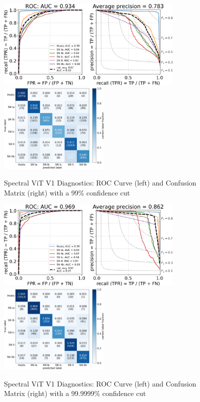 \begin{figure}
    \centering
    \includegraphics[height=4.3cm]{figures/v1_real/vit_model_V1_original_redoroc99_e31.png}
    \quad
    \includegraphics[height=4.3cm]{figures/v1_real/vit_model_V1_original_redocm99_e31.png}
    \caption{Spectral ViT V1 Diagnostics: ROC Curve (left) and Confusion Matrix (right) with a 99\% confidence
    cut \label{fig:v1_99_qual}}
\end{figure}


\begin{figure}
    \centering
    \includegraphics[height=4.3cm]{figures/v1_real/vit_model_V1_original_redoroc999999_e31.png}
    \quad
    \includegraphics[height=4.3cm]{figures/v1_real/vit_model_V1_original_redocm999999_e31.png}
    \caption{Spectral ViT V1 Diagnostics: ROC Curve (left) and Confusion Matrix (right) with a 99.9999\% confidence
    cut \label{fig:v1_999999_qual}}
\end{figure}




